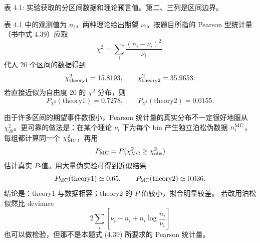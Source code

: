 \begin{question}
\begin{enumerate}
表 4.1: 实验获取的分区间数据和理论预言值。第二、三列是区间边界。
\end{enumerate}
\begin{solution}
表 4.1 中的观测值为 \(n_i\)，两种理论给出期望 \(\nu_i\)。按题目所指的
Pearson 型统计量（书中式 4.39）应取
\[
\chi^2=\sum_i\frac{(n_i-\nu_i)^2}{\nu_i}.
\]
代入 20 个区间的数据得到
\[
\chi^2_{\rm theory1}=15.8193,
\qquad
\chi^2_{\rm theory2}=35.9653.
\]
若直接近似为自由度 20 的 \(\chi^2\) 分布，则
\[
P_{\chi^2}(\text{theory1})=0.7278,
\qquad
P_{\chi^2}(\text{theory2})=0.0155.
\]

由于许多区间的期望事件数很小，Pearson 统计量的真实分布不一定很好地服从
\(\chi^2_{20}\)。更可靠的做法是：在某个理论 \(\nu_i\) 下为每个 bin
产生独立泊松伪数据 \(n_i^{\rm MC}\)，每组都计算同一个
\(\chi^2_{\rm MC}\)，再用
\[
P_{\rm MC}=P(\chi^2_{\rm MC}\ge\chi^2_{\rm obs})
\]
估计真实 \(P\)-值。用大量伪实验可得到近似结果
\[
P_{\rm MC}(\text{theory1})\simeq0.65,
\qquad
P_{\rm MC}(\text{theory2})\simeq0.036.
\]
结论是：theory1 与数据相容；theory2 的 \(P\)-值较小，拟合明显较差。
若改用泊松似然比 deviance
\[
2\sum_i\left[\nu_i-n_i+n_i\log\frac{n_i}{\nu_i}\right]
\]
也可以做检验，但那不是本题式 (4.39) 所要求的 Pearson 统计量。
\end{solution}
\end{question}


